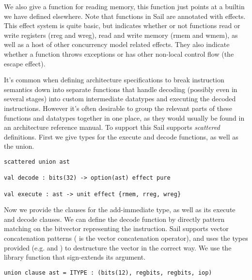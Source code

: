 
\sailoverloadUUX

We also give a function  for reading memory, this function
just points at a builtin we have defined elsewhere. Note that
functions in Sail are annotated with effects. This effect system is
quite basic, but indicates whether or not functions read or write
registers (rreg and wreg), read and write memory (rmem and wmem), as
well as a host of other concurrency model related effects. They also
indicate whether a function throws exceptions or has other non-local
control flow (the escape effect).


It's common when defining architecture specifications to break
instruction semantics down into separate functions that handle
decoding (possibly even in several stages) into custom intermediate
datatypes and executing the decoded instructions. However it's often
desirable to group the relevant parts of these functions and datatypes
together in one place, as they would usually be found in an
architecture reference manual. To support this Sail supports
\emph{scattered} definitions. First we give types for the execute and
decode functions, as well as the  union.


\begin{lstlisting}
scattered union ast

val decode : bits(32) -> option(ast) effect pure

val execute : ast -> unit effect {rmem, rreg, wreg}
\end{lstlisting}

Now we provide the clauses for the add-immediate  type, as
well as its execute and decode clauses. We can define the decode
function by directly pattern matching on the bitvector representing
the instruction. Sail supports vector concatenation patterns (
is the vector concatenation operator), and uses the types provided
(e.g.  and ) to destructure the vector in the
correct way. We use the  library function that sign-extends
its argument.

\begin{lstlisting}
union clause ast = ITYPE : (bits(12), regbits, regbits, iop)
\end{lstlisting}

\sailfclITYPEdecode
\sailfclITYPEexecute

